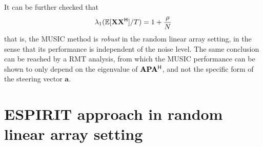 \documentclass[11pt,a4paper]{article}
\begin{document}
It can be further checked that 
\begin{equation}
	\lambda_1({\mathbb{E}}[{\mathbf{X}} {\mathbf{X}}^{\sf H}] /T) = 1 + \frac{\rho}{N}
\end{equation}
that is, the MUSIC method is \emph{robust} in the random linear array setting, in the sense that its performance is independent of the noise level. {\BLUE The same conclusion can be reached by a RMT analysis, from which the MUSIC performance can be shown to only depend on the eigenvalue of ${\mathbf{A}} \mathbf{P} {\mathbf{A}}^{\sf H}$, and not the specific form of the steering vector $\mathbf{a}$. }


\section{ESPIRIT approach in random linear array setting}




\end{document}
